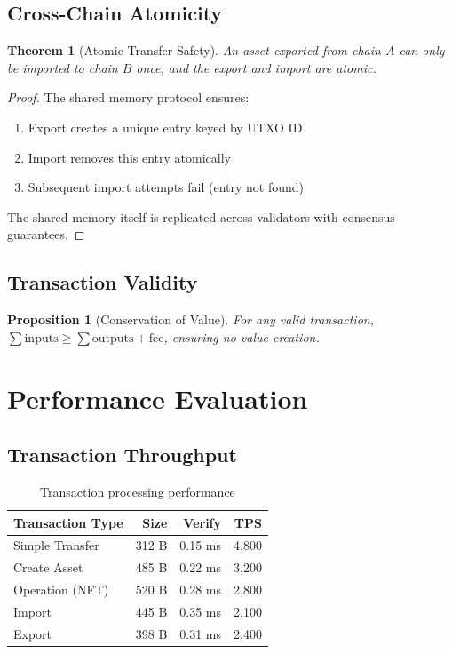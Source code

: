 \documentclass[11pt,a4paper]{article}
\newtheorem{theorem}{Theorem}
\newtheorem{proposition}{Proposition}
\begin{document}
\subsection{Cross-Chain Atomicity}

\begin{theorem}[Atomic Transfer Safety]
An asset exported from chain $A$ can only be imported to chain $B$ once, and the export and import are atomic.
\end{theorem}

\begin{proof}
The shared memory protocol ensures:
\begin{enumerate}
    \item Export creates a unique entry keyed by UTXO ID
    \item Import removes this entry atomically
    \item Subsequent import attempts fail (entry not found)
\end{enumerate}
The shared memory itself is replicated across validators with consensus guarantees.
\end{proof}

\subsection{Transaction Validity}

\begin{proposition}[Conservation of Value]
For any valid transaction, $\sum \text{inputs} \geq \sum \text{outputs} + \text{fee}$, ensuring no value creation.
\end{proposition}

\section{Performance Evaluation}

\subsection{Transaction Throughput}

\begin{table}[h]
\centering
\begin{tabular}{lrrr}
\toprule
\textbf{Transaction Type} & \textbf{Size} & \textbf{Verify} & \textbf{TPS} \\
\midrule
Simple Transfer & 312 B & 0.15 ms & 4,800 \\
Create Asset & 485 B & 0.22 ms & 3,200 \\
Operation (NFT) & 520 B & 0.28 ms & 2,800 \\
Import & 445 B & 0.35 ms & 2,100 \\
Export & 398 B & 0.31 ms & 2,400 \\
\bottomrule
\end{tabular}
\caption{Transaction processing performance}
\end{table}
\end{document}
